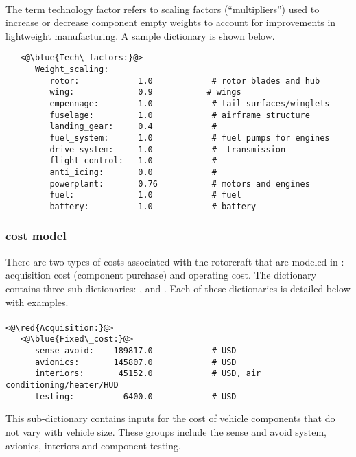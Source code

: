 \paragraph{}
The term technology factor refers to scaling factors (``multipliers'') used to increase or decrease component empty weights to account for improvements in lightweight manufacturing. A sample dictionary is shown below.

\begin{lstlisting}
   <@\blue{Tech\_factors:}@>
      Weight_scaling:
         rotor:            1.0            # rotor blades and hub
         wing:             0.9           # wings
         empennage:        1.0            # tail surfaces/winglets
         fuselage:         1.0            # airframe structure
         landing_gear:     0.4            #  
         fuel_system:      1.0            # fuel pumps for engines
         drive_system:     1.0            #  transmission
         flight_control:   1.0            #  
         anti_icing:       0.0            #  
         powerplant:       0.76           # motors and engines
         fuel:             1.0            # fuel
         battery:          1.0            # battery
\end{lstlisting}

\subsubsection{ cost model}

There are two types of costs associated with the rotorcraft that are modeled in \hydra: acquisition cost (component purchase) and operating cost. The dictionary  contains three sub-dictionaries: ,   and . Each of these dictionaries is detailed below with examples.

\paragraph{}
\begin{lstlisting}
<@\red{Acquisition:}@>
   <@\blue{Fixed\_cost:}@>
      sense_avoid:    189817.0            # USD 
      avionics:       145807.0            # USD
      interiors:       45152.0            # USD, air conditioning/heater/HUD
      testing:          6400.0            # USD 
\end{lstlisting}
This sub-dictionary contains inputs for the cost of vehicle components that do not vary with vehicle size. These groups include the sense and avoid system, avionics, interiors and component testing.

